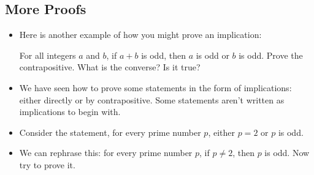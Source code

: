 \subsection*{More Proofs}
\begin{itemize}
  \item Here is another example of how you might prove an implication:
  
  \ex For all integers $a$ and $b$, if $a + b$ is odd, then $a$ is odd or $b$ is odd.  Prove the contrapositive.  What is the converse?  Is it true?
  

  \item We have seen how to prove some statements in the form of implications: either directly or by contrapositive.  Some statements aren't written as implications to begin with.
  
  \item Consider the statement, for every prime number $p$, either $p = 2$ or $p$ is odd.
  
  \item We can rephrase this: for every prime number $p$, if $p \ne 2$, then $p$ is odd.  Now try to prove it.
  
%   
%   
%   
%   
%   
%     
%     
%     
%     


\end{itemize}
